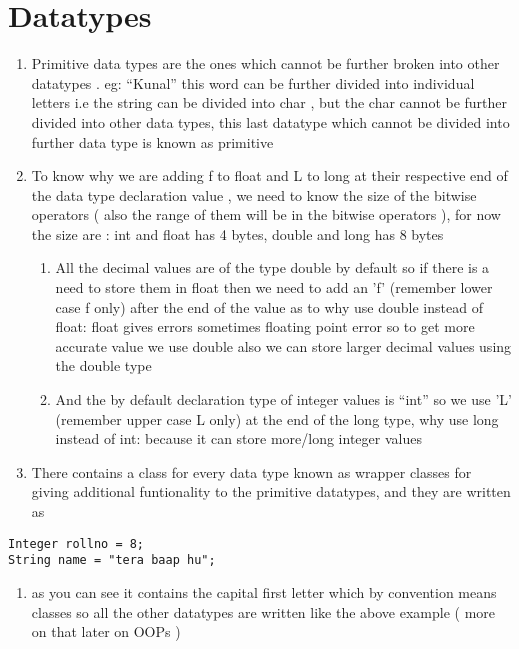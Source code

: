 \documentclass[11pt]{article}
\begin{document}
\section{Datatypes}
\label{sec:org8946611}
\begin{enumerate}
\item Primitive data types are the ones which cannot be further broken into other datatypes . eg: ``Kunal'' this word can be further divided into individual letters i.e the string can be divided into char , but the char cannot be further divided into other data types, this last datatype which cannot be divided into further data type is known as primitive
\item To know why we are adding f to float and L to long at their respective end of the data type declaration value , we need to know the size of the bitwise operators ( also the range of them will be in the bitwise operators ),
for now the size are : int and float has 4 bytes, double and long has 8 bytes
\begin{enumerate}
\item All the decimal values are of the type double by default so if there is a need to store them in float then we need to add an 'f' (remember lower case f only) after the end of the value
as to why use double instead of float: float gives errors sometimes floating point error so to get more accurate value we use double
also we can  store larger decimal values using the double type
\item And the by default declaration type of integer values is ``int'' so we use 'L' (remember upper case L only) at the end of the long type,
why use long instead of int: because it can store more/long integer values
\end{enumerate}

\item There contains a class for every data type known as wrapper classes for giving additional funtionality to the primitive datatypes, and they are written as
\end{enumerate}
\begin{verbatim}
Integer rollno = 8;
String name = "tera baap hu";
\end{verbatim}
\begin{enumerate}
\item as you can see it contains the capital first letter which by convention means classes so all the other datatypes are written like the above example ( more on that later on OOPs )
\end{enumerate}
\end{document}
